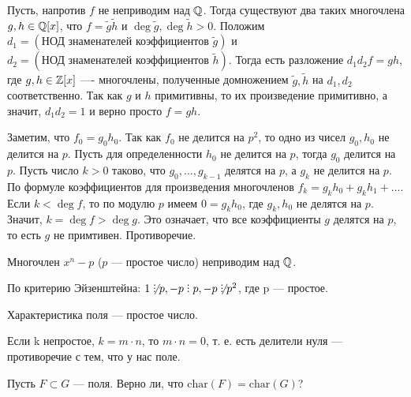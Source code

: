 \begin{solution}
Пусть, напротив \(f\) не неприводим над \(\mathbb{Q}\). Тогда существуют два таких многочлена \(g,h\in\mathbb{Q}[x]\), что
\(f=\tilde{g}\tilde{h}\) и \(\deg{\tilde{g}}, \deg{\tilde{h}} > 0\).
Положим \(d_1 = (\text{НОД знаменателей коэффициентов }\tilde{g})\) и \(d_2 = (\text{НОД знаменателей коэффициентов }\tilde{h})\). Тогда есть разложение \(d_1 d_2 f = g h\), где \(g, h \in \mathbb{Z}[x]\) ---- многочлены, полученные домножением \(\tilde{g},\tilde{h}\) на \(d_1,d_2\) соответственно. Так как \(g\) и \(h\) примитивны, то их произведение примитивно, а значит, \(d_1 d_2 = 1\) и верно просто \(f = gh\).

Заметим, что \(f_0 = g_0 h_0\). Так как \(f_0\) не делится на \(p^2\), то одно из чисел \(g_0, h_0\) не делится на \(p\). Пусть для определенности \(h_0\) не делится на \(p\), тогда \(g_0\) делится на \(p\). Пусть число \(k > 0\) таково, что \(g_0, \ldots, g_{k-1}\) делятся на \(p\), а \(g_k\) не делится на \(p\). По формуле коэффициентов для произведения многочленов \(f_k = g_k h_0 + g_k h_1 + \ldots\). Если \(k < \deg f\), то по модулю \(p\) имеем \(0 = g_k h_0\), где \(g_k, h_0\) не делятся на \(p\). Значит, \(k = \deg f > \deg g\). Это означает, что все коэффициенты \(g\) делятся на \(p\), то есть \(g\) не примтивен.
Противоречие.
\end{solution}

\begin{problem}
Многочлен $x^n - p$ ($p$ --- простое число) неприводим над $\mathbb{Q}$.
\end{problem}

\begin{solution}
По критерию Эйзенштейна: \(1 \not\Divby p, -p \Divby p, -p \not\Divby p^2\), где p --- простое.
\end{solution}

\begin{problem}[26(6.3)]
Характеристика поля --- простое число.
\end{problem}

\begin{solution}
Если k непростое, \(k=m\cdot n\), то \(m\cdot n = 0\), т. е. есть делители нуля --- противоречие с тем, что у нас поле.
\end{solution}

\begin{problem}
Пусть $F \subset G$ --- поля. Верно ли, что $\mathrm{char}(F) = \mathrm{char}(G)$?
\end{problem}


